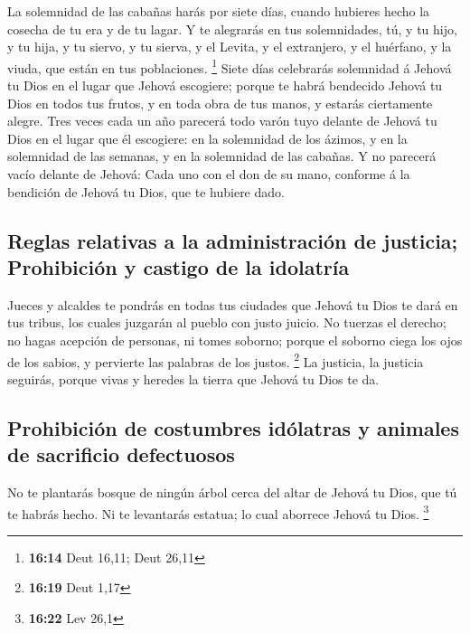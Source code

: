  La solemnidad de las cabañas harás por siete días, cuando
hubieres hecho la cosecha de tu era y de tu lagar.  Y te
alegrarás en tus solemnidades, tú, y tu hijo, y tu hija, y tu siervo, y
tu sierva, y el Levita, y el extranjero, y el huérfano, y la viuda, que
están en tus poblaciones. \footnote{\textbf{16:14} Deut 16,11; Deut
  26,11}  Siete días celebrarás solemnidad á Jehová tu Dios
en el lugar que Jehová escogiere; porque te habrá bendecido Jehová tu
Dios en todos tus frutos, y en toda obra de tus manos, y estarás
ciertamente alegre.  Tres veces cada un año parecerá todo
varón tuyo delante de Jehová tu Dios en el lugar que él escogiere: en la
solemnidad de los ázimos, y en la solemnidad de las semanas, y en la
solemnidad de las cabañas. Y no parecerá vacío delante de Jehová:
 Cada uno con el don de su mano, conforme á la bendición de
Jehová tu Dios, que te hubiere dado.

\hypertarget{reglas-relativas-a-la-administraciuxf3n-de-justicia-prohibiciuxf3n-y-castigo-de-la-idolatruxeda}{%
\subsection{Reglas relativas a la administración de justicia;
Prohibición y castigo de la
idolatría}\label{reglas-relativas-a-la-administraciuxf3n-de-justicia-prohibiciuxf3n-y-castigo-de-la-idolatruxeda}}

 Jueces y alcaldes te pondrás en todas tus ciudades que
Jehová tu Dios te dará en tus tribus, los cuales juzgarán al pueblo con
justo juicio.  No tuerzas el derecho; no hagas acepción de
personas, ni tomes soborno; porque el soborno ciega los ojos de los
sabios, y pervierte las palabras de los justos. \footnote{\textbf{16:19}
  Deut 1,17}  La justicia, la justicia seguirás, porque
vivas y heredes la tierra que Jehová tu Dios te da.

\hypertarget{prohibiciuxf3n-de-costumbres-iduxf3latras-y-animales-de-sacrificio-defectuosos}{%
\subsection{Prohibición de costumbres idólatras y animales de sacrificio
defectuosos}\label{prohibiciuxf3n-de-costumbres-iduxf3latras-y-animales-de-sacrificio-defectuosos}}

 No te plantarás bosque de ningún árbol cerca del altar de
Jehová tu Dios, que tú te habrás hecho.  Ni te levantarás
estatua; lo cual aborrece Jehová tu Dios. \footnote{\textbf{16:22} Lev
  26,1}

